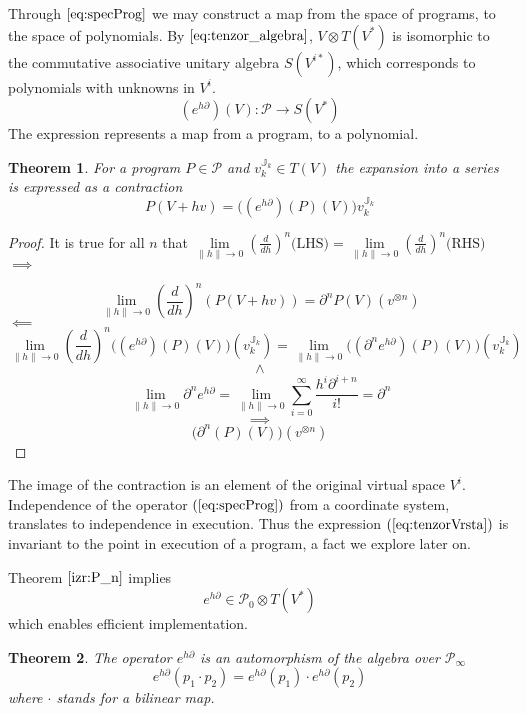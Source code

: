 \documentclass{article}
\newcommand{\JJ}{\mathbb{J}}
\newcommand{\dP}{\mathcal{P}}
\newcommand{\D}{\partial}
\newtheorem{izrek}{Theorem}[section]
\begin{document}
Through $\eqref{eq:specProg}$ we may construct a map from the space of programs, to the space of polynomials. By $\eqref{eq:tenzor_algebra}$, $V\otimes T(V^*)$ is isomorphic to the commutative associative unitary algebra $S(V^{i*})$, which corresponds to polynomials with unknowns in $V^i$.
 \begin{equation}\label{eq:pToPol}
 	(e^{h\D})(V): \dP\to S(V^*)
 \end{equation}
 The expression represents a map from a program, to a polynomial. 
 
\begin{izrek}\label{izr:e^d}
	For a program $P\in\dP$ and $v^{\JJ_k}_{k}\in T(V)$ the expansion into a series is expressed as a contraction\\
	\begin{equation}\label{eq:tenzorVrsta}
	P(V+hv) = \Big((e^{h\D})(P)(V)\Big)v^{\JJ_k}_{k}
	\end{equation}
\end{izrek}
 
 \begin{proof}
It is true for all $n$ that $\lim\limits_{\lVert h\rVert\to 0}(\frac{d}{dh})^n\text{(LHS)}=\lim\limits_{\lVert h\rVert\to 0}(\frac{d}{dh})^n\text{(RHS)}$\\
 $\implies$
 
 $$\lim\limits_{\lVert h\rVert\to 0}(\frac{d}{dh})^n(P(V+hv))=\D^n P(V)(v^{\otimes n})$$
 $\impliedby$
 $$\lim\limits_{\lVert h\rVert\to 0}(\frac{d}{dh})^n\Big((e^{h\D})(P)(V)\Big)(v^{\JJ_k}_{k})=\lim\limits_{\lVert h\rVert\to 0}\Big((\D^n e^{h\D})(P)(V)\Big)(v^{\JJ_k}_{k})$$
 $$\land$$
 $$\lim\limits_{\lVert h\rVert\to 0}\D^ne^{h\D}=\lim\limits_{\lVert h\rVert\to 0}\sum\limits_{i=0}^{\infty}\frac{h^i\D^{i+n}}{i!}=\D^n$$
 $$\implies$$
 $$\Big(\D^n(P)(V)\Big)(v^{\otimes n})$$
 \end{proof}
 
 The image of the contraction is an element of the original virtual space $V^i$. Independence of the operator $(\ref{eq:specProg})$ from a coordinate system, translates to independence in execution. Thus the expression $(\ref{eq:tenzorVrsta})$ is invariant to the point in execution of a program, a fact we explore later on.  
 
 Theorem $\ref{izr:P_n}$ implies
     \begin{equation}
     	e^{h\D}\in\dP_0\otimes T(V^*)
     \end{equation}      
which enables efficient implementation.
 
 \begin{izrek}\label{izr:prod}
 The operator $e^{h\D}$ is an automorphism of the algebra over $\dP_\infty$
 \begin{equation}
 	e^{h\D}(p_1\cdot p_2)=e^{h\D}(p_1)\cdot e^{h\D}(p_2)
 \end{equation}
 where $\cdot$ stands for a bilinear map.
 \end{izrek}
 
\end{document}
